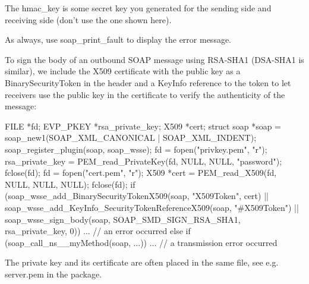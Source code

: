 The hmac\_\-key is some secret key you generated for the sending side and receiving side (don't use the one shown here).

As always, use soap\_\-print\_\-fault to display the error message.

To sign the body of an outbound SOAP message using RSA-\/SHA1 (DSA-\/SHA1 is similar), we include the X509 certificate with the public key as a BinarySecurityToken in the header and a KeyInfo reference to the token to let receivers use the public key in the certificate to verify the authenticity of the message:


\begin{DoxyCode}
    FILE *fd;
    EVP_PKEY *rsa_private_key;
    X509 *cert;
    struct soap *soap = soap_new1(SOAP_XML_CANONICAL | SOAP_XML_INDENT);
    soap_register_plugin(soap, soap_wsse);
    fd = fopen("privkey.pem", "r");
    rsa_private_key = PEM_read_PrivateKey(fd, NULL, NULL, "password");
    fclose(fd);
    fd = fopen("cert.pem", "r");
    X509 *cert = PEM_read_X509(fd, NULL, NULL, NULL);
    fclose(fd);
    if (soap_wsse_add_BinarySecurityTokenX509(soap, "X509Token", cert)
     || soap_wsse_add_KeyInfo_SecurityTokenReferenceX509(soap, "#X509Token")
     || soap_wsse_sign_body(soap, SOAP_SMD_SIGN_RSA_SHA1, rsa_private_key, 0))
      ... // an error occurred
    else if (soap_call_ns__myMethod(soap, ...))
      ... // a transmission error occurred
\end{DoxyCode}


The private key and its certificate are often placed in the same file, see e.g. server.pem in the package.

